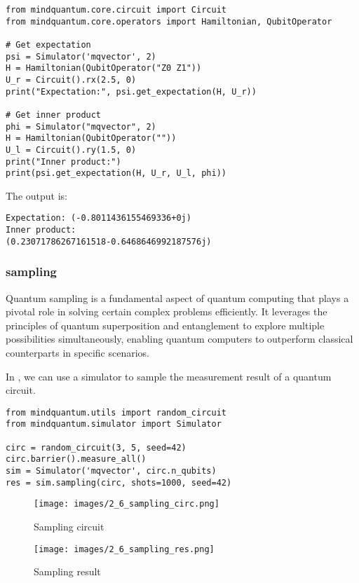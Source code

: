 \begin{lstlisting}
from mindquantum.core.circuit import Circuit
from mindquantum.core.operators import Hamiltonian, QubitOperator

# Get expectation
psi = Simulator('mqvector', 2)
H = Hamiltonian(QubitOperator("Z0 Z1"))
U_r = Circuit().rx(2.5, 0)
print("Expectation:", psi.get_expectation(H, U_r))

# Get inner product
phi = Simulator("mqvector", 2)
H = Hamiltonian(QubitOperator(""))
U_l = Circuit().ry(1.5, 0)
print("Inner product:")
print(psi.get_expectation(H, U_r, U_l, phi))
\end{lstlisting}
The output is:

\begin{lstlisting}
Expectation: (-0.8011436155469336+0j)
Inner product:
(0.23071786267161518-0.6468646992187576j)
\end{lstlisting}

\subsubsection{sampling}

Quantum sampling is a fundamental aspect of quantum computing that plays a pivotal role in solving certain complex problems efficiently. It leverages the principles of quantum superposition and entanglement to explore multiple possibilities simultaneously, enabling quantum computers to outperform classical counterparts in specific scenarios.

In \MindQuantum, we can use a simulator to sample the measurement result of a quantum circuit.
\begin{lstlisting}
from mindquantum.utils import random_circuit
from mindquantum.simulator import Simulator

circ = random_circuit(3, 5, seed=42)
circ.barrier().measure_all()
sim = Simulator('mqvector', circ.n_qubits)
res = sim.sampling(circ, shots=1000, seed=42)
\end{lstlisting}

\begin{figure}[h]
    \begin{center}
        \texttt{[image: images/2\_6\_sampling\_circ.png]}
    \end{center}
    \caption{Sampling circuit}
\end{figure}

\begin{figure}[h]
    \begin{center}
        \texttt{[image: images/2\_6\_sampling\_res.png]}
    \end{center}
    \caption{Sampling result}
\end{figure}
